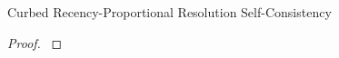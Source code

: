 \begin{theorem}{Curbed Recency-Proportional Resolution Self-Consistency}
\label{thm:curbed-recency-proportional-resolution-algo-self-consistency}

\end{theorem}

\begin{proof}
\label{prf:curbed-recency-proportional-resolution-algo-self-consistency}

\end{proof}
